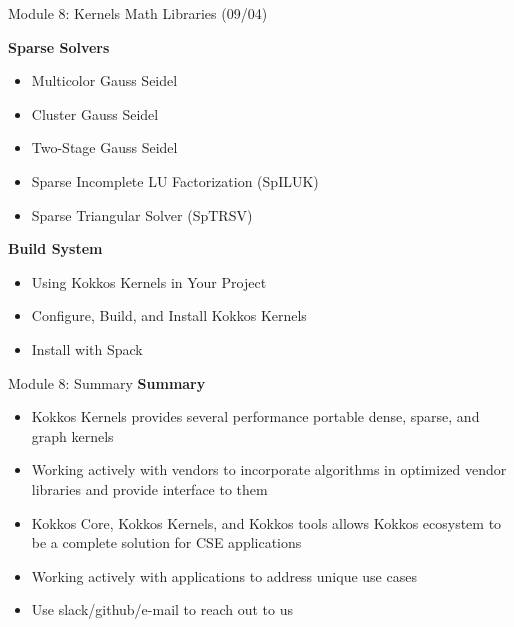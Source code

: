 \begin{frame}[fragile]{Module 8: Kernels Math Libraries (09/04)}

	\vspace{3pt}
	\textbf{Sparse Solvers}
	\begin{itemize}
        \item Multicolor Gauss Seidel
        \item Cluster Gauss Seidel
        \item Two-Stage Gauss Seidel
        \item Sparse Incomplete LU Factorization (SpILUK)
        \item Sparse Triangular Solver (SpTRSV)
	\end{itemize}

	\vspace{3pt}
	\textbf{Build System}
	\begin{itemize}
        \item Using Kokkos Kernels in Your Project
        \item Configure, Build, and Install Kokkos Kernels
        \item Install with Spack
	\end{itemize}

\end{frame}









\begin{frame}[fragile]{Module 8: Summary}
  \textbf{Summary}
	\begin{itemize}
    \item Kokkos Kernels provides several performance portable dense, sparse, and graph kernels
    \item Working actively with vendors to incorporate algorithms in optimized vendor libraries and provide interface to them
    \item Kokkos Core, Kokkos Kernels, and Kokkos tools allows Kokkos ecosystem to be a complete solution for CSE applications
    \item Working actively with applications to address unique use cases
    \item Use slack/github/e-mail to reach out to us
	\end{itemize}
\end{frame}







